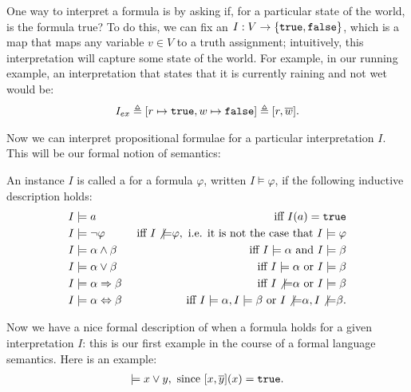 \documentclass{tufte-handout}
\begin{document}
One way to interpret a formula is by asking if, for a particular state of the
world, is the formula true? To do this, we can fix an  $I : V
\rightarrow \{\texttt{true}, \texttt{false}\}$, which is a map that maps any variable $v \in V$
to a truth assignment; intuitively, this interpretation will capture some state 
of the world. For example, in our running example, an interpretation that states 
that it is currently raining and not wet would be:
\begin{align}
    I_{ex} \triangleq [r \mapsto \true, w \mapsto \false] \triangleq [r, \overline{w}].
    \label{eq:iex}
\end{align}

Now we can interpret propositional formulae for a particular interpretation $I$.
This will be our formal notion of semantics:
\begin{definition}  
    An instance $I$ is called a  for a formula $\varphi$, written $I
    \models \varphi$, if the following inductive description holds:
\begin{align*}
    I &\models a & \text{ iff } I(a) = \texttt{true} \\
    I &\models \neg \varphi & \text{ iff } I \not{\models} \varphi, \text{ i.e. it is not the case that } I \models \varphi \\
    I &\models \alpha \land \beta & \text{ iff } I \models \alpha \text{ and } I \models \beta \\
    I &\models \alpha \lor \beta & \text{ iff } I \models \alpha \text{ or } I \models \beta \\
    I &\models \alpha \Rightarrow \beta & \text{ iff } I \not{\models} \alpha \text{ or } I \models \beta \\
    I &\models \alpha \Leftrightarrow \beta & \text{ iff } I \models \alpha, I \models \beta \text{ or }  I \not{\models} \alpha, I \not{\models} \beta. \\
\end{align*}
\end{definition}
Now we have a nice formal description of when a formula holds for a 
given interpretation $I$: this is our first example in the course of a 
formal language semantics. Here is an example:
\begin{align*}
    [x, \overline{y}] \models x \lor y, \text{ since } [x, \overline{y}](x) = \true.
\end{align*}
\end{document}
